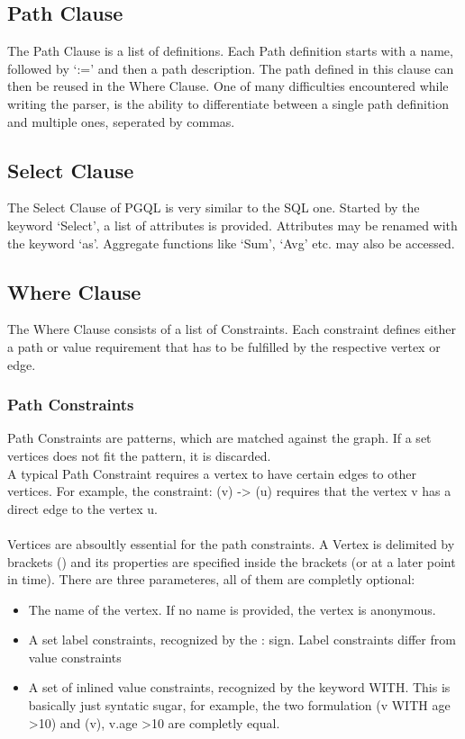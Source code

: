 \documentclass[11pt,singlecolumn]{scrartcl}
\begin{document}
\subsection{Path Clause}

The Path Clause is a list of definitions. Each Path definition starts with a name, followed by `:=' and then a path description. The path defined in this clause can then be reused in the Where Clause. One of many difficulties encountered while writing the parser, is the ability to differentiate between a single path definition and multiple ones, seperated by commas.


\clearpage
\subsection{Select Clause}
The Select Clause of PGQL is very similar to the SQL one. Started by the keyword `Select', a list of attributes is provided. Attributes may be renamed with the keyword `as'. Aggregate functions like `Sum', `Avg' etc. may also be accessed.

\clearpage

\subsection{Where Clause}
The Where Clause consists of a list of Constraints. Each constraint defines either a path or value requirement that has to be fulfilled by the respective vertex or edge.
 
 \subsubsection{Path Constraints}
 Path Constraints are patterns, which are matched against the graph. If a set vertices does not fit the pattern, it is discarded.\\
 A typical Path Constraint requires a vertex to have certain edges to other vertices. For example, the constraint: (v) -> (u) requires that the vertex v has a direct edge to the vertex u.\\\\Vertices are absoultly essential for the path constraints. A Vertex is delimited by brackets () and its properties are specified inside the brackets (or at a later point in time). There are three parameteres, all of them are completly optional:\\
 \begin{itemize}
 \item The name of the vertex. If no name is provided, the vertex is anonymous.
 \item A set label constraints, recognized by the : sign. Label constraints differ from value constraints
 \item A set of inlined value constraints, recognized by the keyword WITH. This is basically just syntatic sugar, for example, the two formulation (v WITH age \textgreater 10) and (v), v.age \textgreater 10 are completly equal.
 \end{itemize}
 
\end{document}
